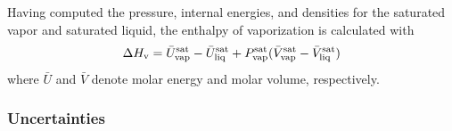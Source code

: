 \documentclass[journal=jced,manuscript=article]{achemso}
\begin{document}

Having computed the pressure, internal energies, and densities for the saturated vapor and saturated liquid, the enthalpy of vaporization is calculated with
\begin{equation}
\Delta H_{\rm v} = \bar U_{\rm vap}^{\rm sat} - \bar U_{\rm liq}^{\rm sat} + P_{\rm vap}^{\rm sat} (\bar V_{\rm vap}^{\rm sat} - \bar V_{\rm liq}^{\rm sat})
\end{equation}
where $\bar U$ and $\bar V$ denote molar energy and molar volume, respectively.

\subsubsection{Uncertainties} \label{sec: Uncertainties}
\end{document}
